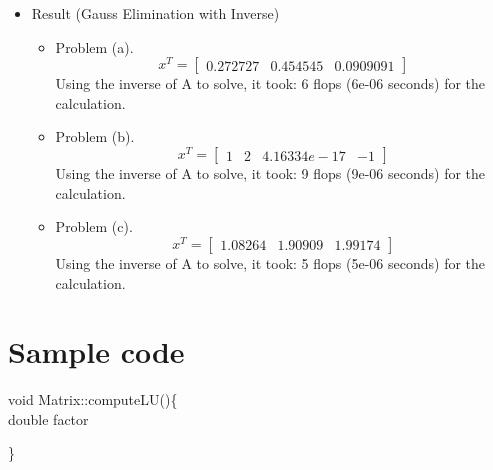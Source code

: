 \documentclass[12pt]{beamer}
\begin{document}
       \begin{frame}
       \begin{itemize}
\item Result (Gauss Elimination with Inverse)
       \begin {itemize}
\item Problem (a).\[
       x^T =
       \begin{bmatrix}
       	0.272727 &	
       	0.454545 &	
       	0.0909091	
       \end{bmatrix}
       \]
Using the inverse of A to solve, it took: 6 flops (6e-06 seconds) for the calculation.
\item Problem (b).\[
       x^T =
       \begin{bmatrix}
       	1 &	
       	2 &
       	4.16334e-17 &	
       	-1	
       \end{bmatrix}
       \]
Using the inverse of A to solve, it took: 9 flops (9e-06 seconds) for the calculation.
\item Problem (c).\[
       x^T =
       \begin{bmatrix}
       	1.08264 &	
       	1.90909	&
       	1.99174	
       \end{bmatrix}
       \]
Using the inverse of A to solve, it took: 5 flops (5e-06 seconds) for the calculation.
     \end{itemize} 
     \end{itemize}
       \end{frame}
\section{Sample code}
\begin{frame}
\begin{algorithm}[H]
void Matrix::computeLU()\{\\
  	double factor\;
    
\end{algorithm}
\end{frame}

\begin{frame}
\begin{algorithm}[H]
\}
\end{algorithm}
\end{frame}
\end{document}
